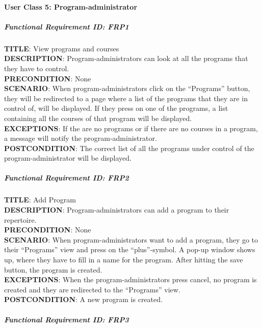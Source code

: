 \documentclass[12pt]{article}
\begin{document}
\paragraph{User Class 5:
Program-administrator}\label{user-class-5-program-administrator}

\subparagraph{Functional Requirement \textbf{ID}:
FRP1}\label{functional-requirement-id-frp1}

\textbf{TITLE}: View programs and courses\\\textbf{DESCRIPTION}:
Program-administrators can look at all the programs that they have to
control.\\\textbf{PRECONDITION}: None\\\textbf{SCENARIO}: When
program-administrators click on the ``Programs'' button, they will be
redirected to a page where a list of the programs that they are in
control of, will be displayed. If they press on one of the programs, a
list containing all the courses of that program will be
displayed.\\\textbf{EXCEPTIONS}: If the are no programs or if there are
no courses in a program, a message will notify the
program-administrator.\\\textbf{POSTCONDITION}: The correct list of all
the programs under control of the program-administrator will be
displayed.

\subparagraph{Functional Requirement \textbf{ID}:
FRP2}\label{functional-requirement-id-frp2}

\textbf{TITLE}: Add Program\\\textbf{DESCRIPTION}:
Program-administrators can add a program to their
repertoire.\\\textbf{PRECONDITION}: None\\\textbf{SCENARIO}: When
program-administrators want to add a program, they go to their
``Programs'' view and press on the ``plus''-symbol. A pop-up window
shows up, where they have to fill in a name for the program. After
hitting the save button, the program is created.\\\textbf{EXCEPTIONS}:
When the program-administrators press cancel, no program is created and
they are redirected to the ``Programs'' view.\\\textbf{POSTCONDITION}: A
new program is created.

\subparagraph{Functional Requirement \textbf{ID}:
FRP3}\label{functional-requirement-id-frp3}
\end{document}
